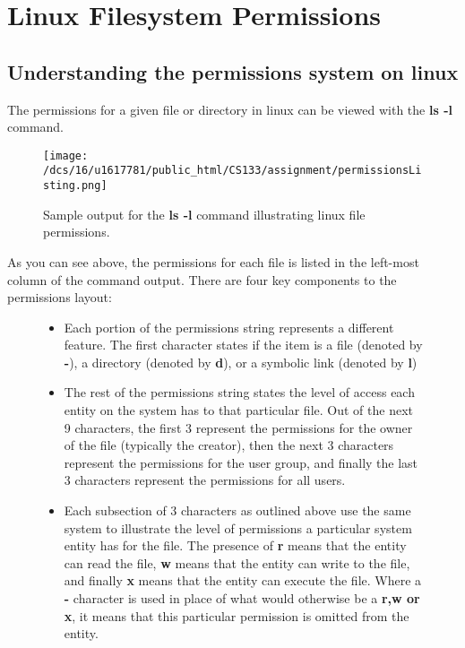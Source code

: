 \documentclass{article}
\begin{document}
\section{Linux Filesystem Permissions}

\subsection{Understanding the permissions system on linux}
The permissions for a given file or directory in linux can be viewed with the \textbf{ls -l} command.

  \begin{figure}[h]
    \label{perm1}
    \texttt{[image: /dcs/16/u1617781/public\_html/CS133/assignment/permissionsListing.png]}
    \caption{Sample output for the \textbf{ls -l} command illustrating linux file permissions.}
  \end{figure}\cite{permScreenshot1}

As you can see above, the permissions for each file is listed in the left-most column of the command output. There are four key components to the permissions layout:

\begin{figure}[h]
  \begin{itemize}
    \item Each portion of the permissions string represents a different feature. The first character states if the item is a file (denoted by \textbf{-}),
    a directory (denoted by \textbf{d}), or a symbolic link (denoted by \textbf{l})
    \item The rest of the permissions string states the level of access each entity on the system has to that particular file. Out of the next 9 characters,
    the first 3 represent the permissions for the owner of the file (typically the creator), then the next 3 characters represent the permissions for the user group, and finally
    the last 3 characters represent the permissions for all users.
    \item Each subsection of 3 characters as outlined above use the same system to illustrate the level of permissions a particular system entity has for the file.
    The presence of \textbf{r} means that the entity can read the file, \textbf{w} means that the entity can write to the file, and finally \textbf{x} means that the entity
    can execute the file. Where a \textbf{-} character is used in place of what would otherwise be a \textbf{r,w or x}, it means that this particular permission is omitted
    from the entity.
  \end{itemize}
\end{figure}
\end{document}
